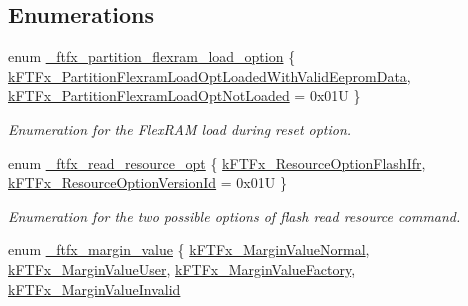 \subsection*{Enumerations}
\begin{DoxyCompactItemize}
\item 
enum \mbox{\hyperlink{group__ftfx__controller_ga59fd3ff5f66c9a21c80a48a95a085648}{\+\_\+ftfx\+\_\+partition\+\_\+flexram\+\_\+load\+\_\+option}} \{ \mbox{\hyperlink{group__ftfx__controller_gga59fd3ff5f66c9a21c80a48a95a085648aa061968412676de918b5078454eac64f}{k\+F\+T\+Fx\+\_\+\+Partition\+Flexram\+Load\+Opt\+Loaded\+With\+Valid\+Eeprom\+Data}}, 
\mbox{\hyperlink{group__ftfx__controller_gga59fd3ff5f66c9a21c80a48a95a085648a92aebaf9d5c4b73d88ad90cbd7140636}{k\+F\+T\+Fx\+\_\+\+Partition\+Flexram\+Load\+Opt\+Not\+Loaded}} = 0x01U
 \}
\begin{DoxyCompactList}\small\item\em Enumeration for the Flex\+R\+AM load during reset option. \end{DoxyCompactList}\item 
enum \mbox{\hyperlink{group__ftfx__controller_gad6557da8fe12a2fd572ace03395c3fd8}{\+\_\+ftfx\+\_\+read\+\_\+resource\+\_\+opt}} \{ \mbox{\hyperlink{group__ftfx__controller_ggad6557da8fe12a2fd572ace03395c3fd8aa11a2c42a2eba3c730c8832296cd450b}{k\+F\+T\+Fx\+\_\+\+Resource\+Option\+Flash\+Ifr}}, 
\mbox{\hyperlink{group__ftfx__controller_ggad6557da8fe12a2fd572ace03395c3fd8a531ca4c2d12cec0d61b983f4eaae4c8a}{k\+F\+T\+Fx\+\_\+\+Resource\+Option\+Version\+Id}} = 0x01U
 \}
\begin{DoxyCompactList}\small\item\em Enumeration for the two possible options of flash read resource command. \end{DoxyCompactList}\item 
enum \mbox{\hyperlink{group__ftfx__controller_gaddebf946b93b4027ecf283eb93f08b12}{\+\_\+ftfx\+\_\+margin\+\_\+value}} \{ \mbox{\hyperlink{group__ftfx__controller_ggaddebf946b93b4027ecf283eb93f08b12a9f365ba2fce51dd8bfb81ee00011abf4}{k\+F\+T\+Fx\+\_\+\+Margin\+Value\+Normal}}, 
\mbox{\hyperlink{group__ftfx__controller_ggaddebf946b93b4027ecf283eb93f08b12acf0f80b487bff0a512ed0d55ada4f5c5}{k\+F\+T\+Fx\+\_\+\+Margin\+Value\+User}}, 
\mbox{\hyperlink{group__ftfx__controller_ggaddebf946b93b4027ecf283eb93f08b12ac74843020b12561f71c99383ad09920a}{k\+F\+T\+Fx\+\_\+\+Margin\+Value\+Factory}}, 
\mbox{\hyperlink{group__ftfx__controller_ggaddebf946b93b4027ecf283eb93f08b12ac5c68e00dcb9321f8e7394e64d599fb0}{k\+F\+T\+Fx\+\_\+\+Margin\+Value\+Invalid}}

\end{DoxyCompactItemize}
